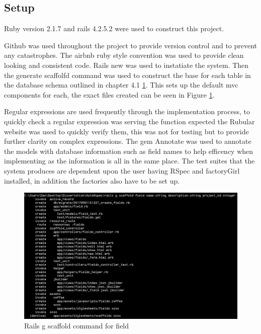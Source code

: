 \documentclass[a4paper,12pt]{article}
\begin{document}
\subsection{Setup}
\par Ruby version 2.1.7 and rails 4.2.5.2 were used to construct this project.
\par Github\cite{github} was used throughout the project to provide version control and to prevent any catastrophes. The airbnb ruby style convention was used to provide clean looking and consistent code\cite{Airbnb}. Rails new was used to instatiate the system. Then the generate scaffolfd command was used to construct the base for each table in the database schema outlined in chapter 4.1 \ref{fig:scaffold}. This sets up the default mvc components for each, the exact files created can be seen in Figure \ref{fig:scaffold}. 
\par Regular expressions are used frequently through the implementation process, to quickly check a regular expression was serving the function expected the Rubular\cite{rubular} website was used to quickly verify them, this was not for testing but to provide further clarity on complex expressions. The gem Annotate\cite{annotate} was used to annotate the models with database information such as field names to help efficency when implementing as the information is all in the same place. The test suites that the system produces are dependent upon the user having RSpec and factoryGirl installed, in addition the factories also have to be set up.

\begin{figure}
\includegraphics[width=\linewidth]{screenshots/scaffold_example}
\caption{Rails g scaffold command for field}
\label{fig:scaffold}
\end{figure}
\end{document}
